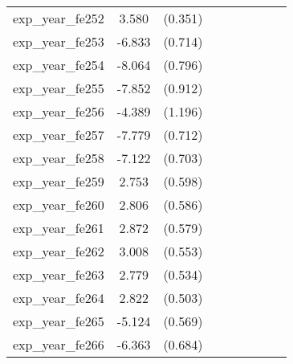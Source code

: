 {\begin{tabular}{l*{4}{cc}}
exp\_year\_fe252&    3.580\sym{***}&  (0.351)&                  &         &                  &         &                  &         \\
exp\_year\_fe253&   -6.833\sym{***}&  (0.714)&                  &         &                  &         &                  &         \\
exp\_year\_fe254&   -8.064\sym{***}&  (0.796)&                  &         &                  &         &                  &         \\
exp\_year\_fe255&   -7.852\sym{***}&  (0.912)&                  &         &                  &         &                  &         \\
exp\_year\_fe256&   -4.389\sym{***}&  (1.196)&                  &         &                  &         &                  &         \\
exp\_year\_fe257&   -7.779\sym{***}&  (0.712)&                  &         &                  &         &                  &         \\
exp\_year\_fe258&   -7.122\sym{***}&  (0.703)&                  &         &                  &         &                  &         \\
exp\_year\_fe259&    2.753\sym{***}&  (0.598)&                  &         &                  &         &                  &         \\
exp\_year\_fe260&    2.806\sym{***}&  (0.586)&                  &         &                  &         &                  &         \\
exp\_year\_fe261&    2.872\sym{***}&  (0.579)&                  &         &                  &         &                  &         \\
exp\_year\_fe262&    3.008\sym{***}&  (0.553)&                  &         &                  &         &                  &         \\
exp\_year\_fe263&    2.779\sym{***}&  (0.534)&                  &         &                  &         &                  &         \\
exp\_year\_fe264&    2.822\sym{***}&  (0.503)&                  &         &                  &         &                  &         \\
exp\_year\_fe265&   -5.124\sym{***}&  (0.569)&                  &         &                  &         &                  &         \\
exp\_year\_fe266&   -6.363\sym{***}&  (0.684)&                  &         &                  &         &                  &         \\

\end{tabular}}
